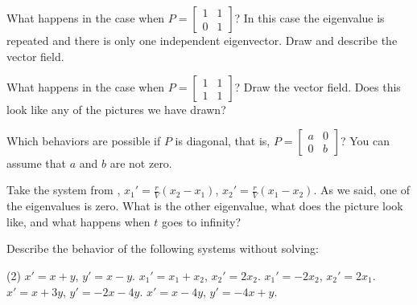 \begin{exercise}
\pagebreak[2]
What happens in the case when $P = 
\left[ \begin{smallmatrix} 1 & 1 \\ 0 & 1 \end{smallmatrix} \right]$?  In
this case the eigenvalue is repeated and there is only one independent eigenvector.
Draw and describe the vector field.
\end{exercise}

\begin{exercise}
What happens in the case when $P = 
\left[ \begin{smallmatrix} 1 & 1 \\ 1 & 1 \end{smallmatrix} \right]$?
Draw the vector field.
Does this look like any of the pictures we have drawn?
\end{exercise}

\begin{exercise}
Which behaviors are possible if $P$ is diagonal, that is,
$P = \left[ \begin{smallmatrix} a & 0 \\ 0 & b \end{smallmatrix} \right]$?
You can assume that $a$ and $b$ are not zero.
\end{exercise}

\begin{exercise}
Take the system from ,
$x_1'=\frac{r}{V}(x_2-x_1)$,
$x_2'=\frac{r}{V}(x_1-x_2)$.
As we said, one of the eigenvalues is zero.  What is the other eigenvalue,
what does the picture look like, and what happens when $t$ goes to infinity?
\end{exercise}

\setcounter{exercise}{100}

\begin{exercise}
Describe the behavior of the following systems without solving:
\begin{tasks}(2)
\task $x' = x + y$, \quad $y' = x-y$.
\task $x_1' = x_1 + x_2$, \quad $x_2' = 2 x_2$.
\task $x_1' = -2x_2$, \quad $x_2' = 2 x_1$.
\task $x' = x + 3y$, \quad $y' = -2x-4y$.
\task $x' = x - 4y$, \quad $y' = -4x+y$.
\end{tasks}
\end{exercise}

